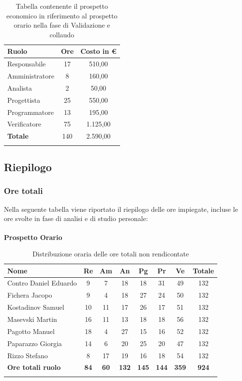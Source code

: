 \documentclass[../piano_di_progetto.tex]{subfiles}
\begin{document}
\begin{center}
	\begin{longtable}{|l|c|c|}
		\hline
		\rowcolor{lightgray}
		\textbf{Ruolo} & \textbf{Ore} & \textbf{Costo in €}\\

		\hline
		Responsabile & 17 & 510,00\\
		Amministratore & 8 & 160,00\\
		Analista & 2 & 50,00\\
		Progettista & 25 & 550,00\\
		Programmatore & 13 & 195,00\\
		Verificatore & 75 & 1.125,00\\
		\hline
		\textbf{Totale} & 140 & 2.590,00\\
		\hline
		\rowcolor{white}
		\caption{Tabella contenente il prospetto economico in riferimento al prospetto orario nella fase di Validazione e collaudo}
	\end{longtable}
\end{center}

\subsection{Riepilogo}%
\label{sub:riepilog}

\subsubsection{Ore totali}
Nella seguente tabella viene riportato il riepilogo delle ore impiegate, incluse le ore svolte in fase di analisi e di studio personale: \\ \\
\textbf{Prospetto Orario}

\begin{center}
	\begin{longtable}{|l|c|c|c|c|c|c|c|}
		\hline
		\rowcolor{lightgray}
		\textbf{Nome} & \textbf{Re} & \textbf{Am} & \textbf{An} & \textbf{Pg}  & \textbf{Pr}   & \textbf{Ve} & \textbf{Totale} \\

		\hline
			Contro Daniel Eduardo & 9 & 7 & 18 & 18 & 31 & 49 & 132 \\
			Fichera Jacopo & 9 & 4 & 18 & 27 & 24 & 50 & 132 \\
			Kostadinov Samuel & 10 & 11 & 17 & 26 & 17 & 51 & 132 \\
			Masevski Martin & 16 & 11 & 13 & 18 & 18 & 56 & 132 \\
			Pagotto Manuel & 18 & 4 & 27 & 15 & 16 & 52 & 132 \\			
			Paparazzo Giorgia & 14 & 6 & 20 & 25 & 20 & 47 & 132 \\
			Rizzo Stefano & 8 & 17 & 19 & 16 & 18 & 54 & 132 \\
			\hline
			\textbf{Ore totali ruolo} & \textbf{84} & \textbf{60} & \textbf{132} & \textbf{145} & \textbf{144} & \textbf{359} & \textbf{924} \\
		\hline	
		\rowcolor{white}
		\caption{Distribuzione oraria delle ore totali non rendicontate}
	\end{longtable}
\end{center}
\end{document}
